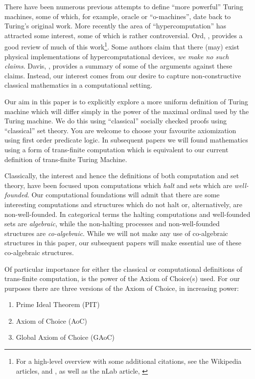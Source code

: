 \documentclass[a4paper]{amsart}
\begin{document}
There have been numerous previous attempts to define ``more powerful'' Turing machines,
some of which, for example, oracle or ``o-machines'', date back to Turing's original work.
More recently the area of ``hypercomputation'' has attracted some interest, some of which
is rather controversial. Ord, \cite{ord2006hyperComputation}, provides a good review of
much of this work\footnote{For a high-level overview with some additional citations, see
the Wikipedia articles, \cite{wikipedia2015hyperComputation} and
\cite{wikipedia2015superRecursiveAlgorithm}, as well as the nLab article,
\cite{nLab2015hyperComputation}}. Some authors claim that there (may) exist physical
implementations of hypercomputational devices, \emph{we make \emph{no} such claims}.
Davis, \cite{davis2004hyperComputation}, provides a summary of some of the arguments
against these claims. Instead, our interest comes from our desire to capture
non-constructive classical mathematics in a computational setting.


Our aim in this paper is to explicitly explore a more uniform definition of Turing machine
which will differ simply in the power of the maximal ordinal used by the Turing machine.
We do this using ``classical'' socially checked proofs using ``classical'' set theory. You
are welcome to choose your favourite axiomization using first order predicate logic. In
subsequent papers we will found mathematics using a form of trans-finite computation which
is equivalent to our current definition of trans-finite Turing Machine. 

Classically, the interest and hence the definitions of both computation and set theory,
have been focused upon computations which \emph{halt} and sets which are
\emph{well-founded}. Our computational foundations will admit that there are some
interesting computations and structures which do not halt or, alternatively, are
non-well-founded. In categorical terms the halting computations and well-founded sets are
\emph{algebraic}, while the non-halting processes and non-well-founded structures are
\emph{co-algebraic}. While we will not make any use of co-algebraic structures in this
paper, our subsequent papers will make essential use of these co-algebraic structures.

Of particular importance for either the classical or computational definitions of
trans-finite computation, is the power of the Axiom of Choice(s) used. For our purposes
there are three versions of the Axiom of Choice, in increasing power:
%
\begin{enumerate}
\item Prime Ideal Theorem (PIT)
\item Axiom of Choice (AoC)
\item Global Axiom of Choice (GAoC)
\end{enumerate}
\end{document}
